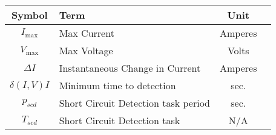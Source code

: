 \begin{center}
    \bgroup
    \begin{tabular}{| c | l | c | c |}
        \hline
        Symbol & Term & Unit \\  \hline \hline \cline{1-3}
        $I_{\max}$ & Max Current & Amperes\\ \cline{1-3}
        $V_{\max}$ & Max Voltage & Volts\\ \cline{1-3}
        $\Delta I$ & Instantaneous Change in Current & Amperes\\ \cline{1-3}
        $\delta(I,V) I$ & Minimum time to detection & sec.\\ \cline{1-3}
        $p_{scd}$ & Short Circuit Detection task period & sec.\\ \cline{1-3}
        $T_{scd}$ & Short Circuit Detection task & N/A\\ \cline{1-3}
        \hline
    \end{tabular}
    \egroup
    \end{center}